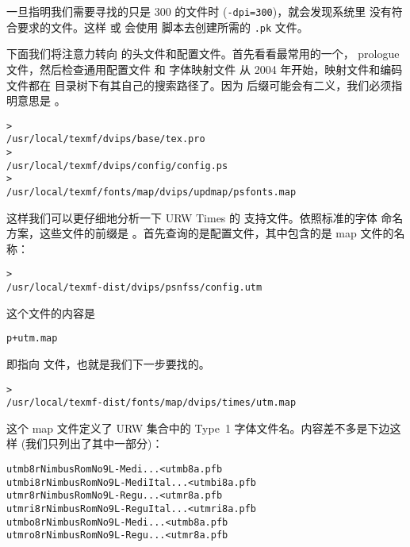 \documentclass{article}
\begin{document}
一旦指明我们需要寻找的只是 300\dpi{} 的文件时 (\texttt{-dpi=300})，就会发现系统里
没有符合要求的文件。这样  或  会使用 
脚本去创建所需的 \texttt{.pk} 文件。

下面我们将注意力转向  的头文件和配置文件。首先看看最常用的一个，
prologue 文件，然后检查通用配置文件  和 \PS{} 字体映射文件
\Dash 从 2004 年开始，映射文件和编码文件都在 
目录树下有其自己的搜索路径了。因为  后缀可能会有二义，我们必须指明意思是
。

\begin{alltt}
> 
   /usr/local/texmf/dvips/base/tex.pro
> 
   /usr/local/texmf/dvips/config/config.ps
> 
   /usr/local/texmf/fonts/map/dvips/updmap/psfonts.map
\end{alltt}

这样我们可以更仔细地分析一下 URW Times 的 \PS{} 支持文件。依照标准的字体
命名方案，这些文件的前缀是 。首先查询的是配置文件，其中包含的是 map
文件的名称：

\begin{alltt}
> 
   /usr/local/texmf-dist/dvips/psnfss/config.utm
\end{alltt}

这个文件的内容是

\begin{alltt}
  p +utm.map
\end{alltt}

即指向  文件，也就是我们下一步要找的。

\begin{alltt}
> 
   /usr/local/texmf-dist/fonts/map/dvips/times/utm.map
\end{alltt}

这个 map 文件定义了 URW 集合中的 Type~1 \PS{} 字体文件名。内容差不多是下边这样
(我们只列出了其中一部分)：

\begin{alltt}
utmb8r  NimbusRomNo9L-Medi    ... <utmb8a.pfb
utmbi8r NimbusRomNo9L-MediItal... <utmbi8a.pfb
utmr8r  NimbusRomNo9L-Regu    ... <utmr8a.pfb
utmri8r NimbusRomNo9L-ReguItal... <utmri8a.pfb
utmbo8r NimbusRomNo9L-Medi    ... <utmb8a.pfb
utmro8r NimbusRomNo9L-Regu    ... <utmr8a.pfb
\end{alltt}
\end{document}

